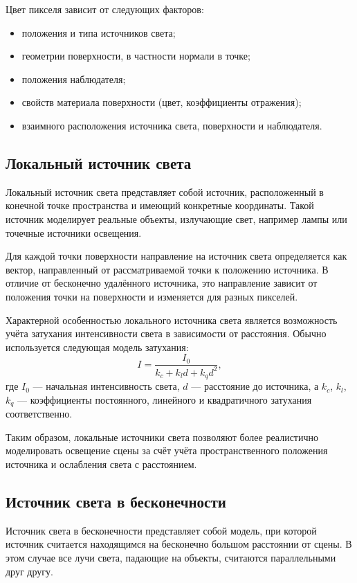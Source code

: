 \documentclass[a4paper, 12pt]{article}
\begin{document}
Цвет пикселя зависит от следующих факторов:
\begin{itemize}
	\item положения и типа источников света;
	\item геометрии поверхности, в частности нормали в точке;
	\item положения наблюдателя;
	\item свойств материала поверхности (цвет, коэффициенты отражения);
	\item взаимного расположения источника света, поверхности и наблюдателя.
\end{itemize}

\subsection{Локальный источник света}

Локальный источник света представляет собой источник, расположенный в конечной точке пространства и имеющий конкретные координаты. Такой источник моделирует реальные объекты, излучающие свет, например лампы или точечные источники освещения.

Для каждой точки поверхности направление на источник света определяется как вектор, направленный от рассматриваемой точки к положению источника. В отличие от бесконечно удалённого источника, это направление зависит от положения точки на поверхности и изменяется для разных пикселей.

Характерной особенностью локального источника света является возможность учёта затухания интенсивности света в зависимости от расстояния. Обычно используется следующая модель затухания:
\[
I = \frac{I_0}{k_c + k_l d + k_q d^2},
\]
где $I_0$ — начальная интенсивность света, $d$ — расстояние до источника, а $k_c$, $k_l$, $k_q$ — коэффициенты постоянного, линейного и квадратичного затухания соответственно.

Таким образом, локальные источники света позволяют более реалистично моделировать освещение сцены за счёт учёта пространственного положения источника и ослабления света с расстоянием.

\subsection{Источник света в бесконечности}

Источник света в бесконечности представляет собой модель, при которой источник считается находящимся на бесконечно большом расстоянии от сцены. В этом случае все лучи света, падающие на объекты, считаются параллельными друг другу.
\end{document}
